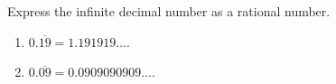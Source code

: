Express the infinite decimal number as a rational number.
\begin{multicols}{2}
\begin{enumerate}
\item $0.\overline{19}=1.191919\dots$.
\item $0.\overline{09}=0.0909090909\dots $.
\end{enumerate}
\end{multicols}